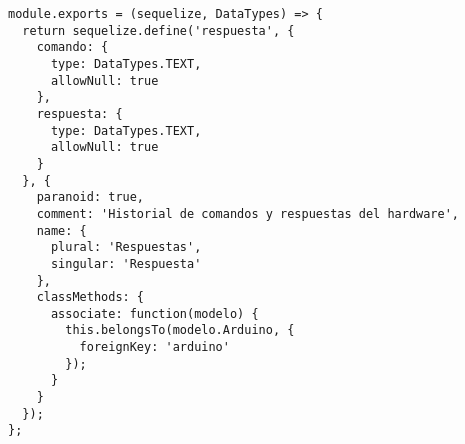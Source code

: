 \begin{lstlisting}[label=anx:modelo_respuesta]
module.exports = (sequelize, DataTypes) => {
  return sequelize.define('respuesta', {
    comando: {
      type: DataTypes.TEXT,
      allowNull: true
    },
    respuesta: {
      type: DataTypes.TEXT,
      allowNull: true
    }
  }, {
    paranoid: true,
    comment: 'Historial de comandos y respuestas del hardware',
    name: {
      plural: 'Respuestas',
      singular: 'Respuesta'
    },
    classMethods: {
      associate: function(modelo) {
        this.belongsTo(modelo.Arduino, {
          foreignKey: 'arduino'
        });
      }
    }
  });
};
\end{lstlisting}